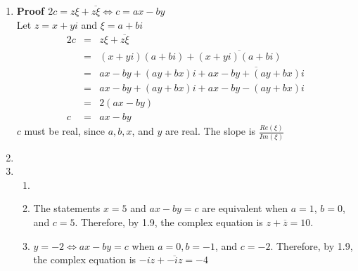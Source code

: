\documentclass{article}%
\newenvironment{proof}[1][]{\begin{samepage}\textbf{Proof #1} }{\end{samepage}}
\begin{document}
\begin{enumerate}
\begin{enumerate}[label*=\arabic*.]
\begin{enumerate}[label=\alph*]
            \item %
            \begin{proof}[$\frac{1}{z^2}=\frac{\overline{z^2}}{(z\overline{z})^2}$]
                \\ Let $z=x+yi$
                \begin{eqnarray*}
                    \frac{1}{z^2}&=&\frac{1}{(x+yi)^2} \\
                                 &=&\frac{1}{x^2-y^2+2xyi} \\
                                 &=&\frac{1}{x^2-y^2+2xyi}\frac{x^2-y^2-2xyi}{x^2-y^2-2xyi} \\
                                 &=&\frac{x^2-y^2-2xyi}{(x^2-y^2)^2} \\
                                 &=&\frac{\overline{z^2}}{(z\overline{z})^2}
                \end{eqnarray*}
            \end{proof}
        \end{enumerate}
        \item %
        \begin{proof}[$2c=z\xi+\overline{z\xi} \Leftrightarrow c=ax-by$]
            \\ Let $z=x+yi$ and $\xi=a+bi$
            \begin{eqnarray*}
                2c&=&z\xi + \overline{z\xi} \\
                  &=&(x+yi)(a+bi) + \overline{(x+yi)(a+bi)} \\
                  &=&ax-by+(ay+bx)i+\overline{ax-by+(ay+bx)i} \\
                  &=&ax-by+(ay+bx)i+ax-by-(ay+bx)i \\
                  &=&2(ax-by) \\
                 c&=&ax-by
            \end{eqnarray*}
            $c$ must be real, since $a, b, x$, and $y$ are real. The slope is $\frac{Re(\xi)}{Im(\xi)}$
        \end{proof}
        \item %
        \item %
        \begin{enumerate}[label=\alph*]
            \item
            \item The statements $x=5$ and $ax-by=c$ are equivalent when $a=1$, $b=0$, and $c=5$. Therefore, by 1.9, the complex equation is $z+\overline{z}=10$.
            \item $y=-2 \Leftrightarrow ax-by=c$ when $a=0, b=-1$, and $c=-2$. Therefore, by 1.9, the complex equation is $-iz+\overline{-iz}=-4$

\end{enumerate}
\end{enumerate}
\end{enumerate}
\end{document}
